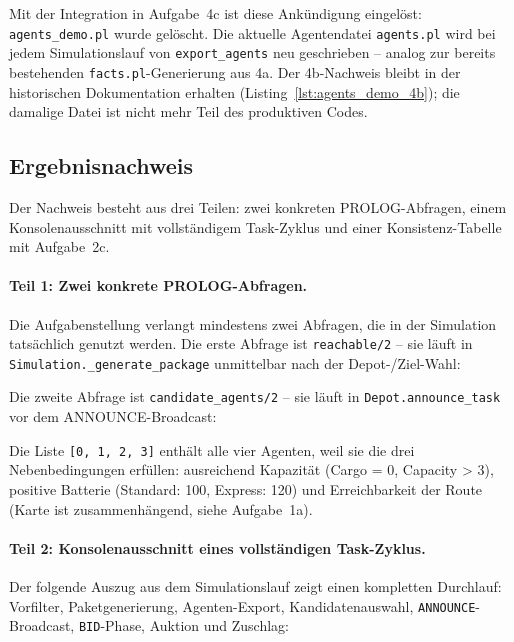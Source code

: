 Mit der Integration in Aufgabe~4c ist diese Ankündigung eingelöst: \texttt{agents\_demo.pl} wurde gelöscht. Die aktuelle Agentendatei \texttt{agents.pl} wird bei jedem Simulationslauf von \texttt{export\_agents} neu geschrieben -- analog zur bereits bestehenden \texttt{facts.pl}-Generierung aus 4a. Der 4b-Nachweis bleibt in der historischen Dokumentation erhalten (Listing~\ref{lst:agents_demo_4b}); die damalige Datei ist nicht mehr Teil des produktiven Codes.


\subsection{Ergebnisnachweis}
\label{sssec:prolog_4c_nachweis}

Der Nachweis besteht aus drei Teilen: zwei konkreten \acs{PROLOG}-Abfragen, einem Konsolenausschnitt mit vollständigem Task-Zyklus und einer Konsistenz-Tabelle mit Aufgabe~2c.

\paragraph{Teil 1: Zwei konkrete \acs{PROLOG}-Abfragen.}
Die Aufgabenstellung verlangt mindestens zwei Abfragen, die in der Simulation tatsächlich genutzt werden. Die erste Abfrage ist \texttt{reachable/2} -- sie läuft in \\ \texttt{Simulation.\_generate\_package} unmittelbar nach der Depot-/Ziel-Wahl:



Die zweite Abfrage ist \texttt{candidate\_agents/2} -- sie läuft in \texttt{Depot.announce\_task} vor dem ANNOUNCE-Broadcast:



Die Liste \texttt{[0, 1, 2, 3]} enthält alle vier Agenten, weil sie die drei Nebenbedingungen erfüllen: ausreichend Kapazität (Cargo = 0, Capacity > 3), positive Batterie (Standard: 100, Express: 120) und Erreichbarkeit der Route (Karte ist zusammenhängend, siehe Aufgabe~1a).

\paragraph{Teil 2: Konsolenausschnitt eines vollständigen Task-Zyklus.}
Der folgende Auszug aus dem Simulationslauf zeigt einen kompletten Durchlauf: Vorfilter, Paketgenerierung, Agenten-Export, Kandidatenauswahl, \texttt{ANNOUNCE}-Broadcast, \texttt{BID}-Phase, Auktion und Zuschlag:

